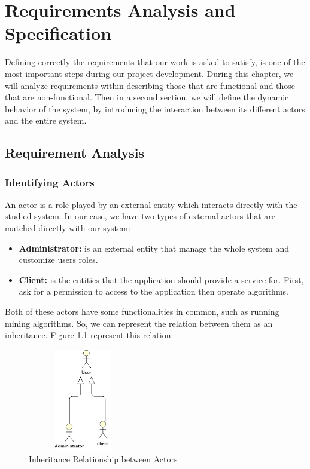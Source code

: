 \chapter{Requirements Analysis and Specification}
\label{Chapter3} 
Defining correctly the requirements that our work is asked to satisfy, is one of the most important steps during our project development. During this chapter, we will analyze requirements within describing those that are functional and those that are non-functional. Then in a second section, we will define the dynamic behavior of the system, by introducing the interaction between its different actors and the entire system. 
\section{Requirement Analysis}
\subsection{Identifying Actors}
An actor is a role played by an external entity which interacts directly with the studied system. In our case, we have two types of external actors that are matched directly with our system: \\
\begin{itemize}
\item \textbf{Administrator:} is an external entity that manage the whole system and customize users roles.\\
\item \textbf{Client:} is the entities that the application should provide a service for. First, ask for a permission to access to the application then operate algorithms.\\  
\end{itemize}




Both of these actors have some functionalities in common, such as running mining algorithms. So, we can represent the relation between them as an inheritance. Figure \ref{actors} represent this relation:

\begin{figure}[!ht]
\begin{center}
\includegraphics[width=4.75cm,height=4.5cm]{chapter3/actors.png}
\end{center}
\caption{Inheritance Relationship between Actors}
\label{actors}
\end{figure}


